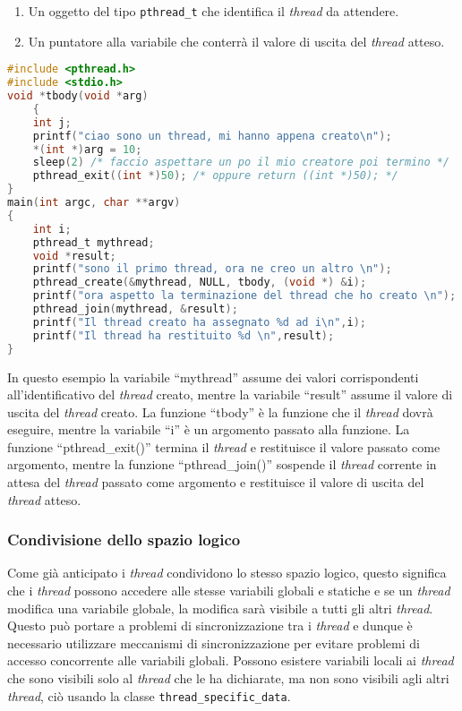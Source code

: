         \begin{enumerate}
            \item Un oggetto del tipo \texttt{pthread\_t} che identifica il \textit{thread} da attendere.
            \item Un puntatore alla variabile che conterrà il valore di uscita del \textit{thread} atteso.
        \end{enumerate}
\begin{lstlisting}[language=C]
#include <pthread.h>
#include <stdio.h>
void *tbody(void *arg)
    {
    int j;
    printf("ciao sono un thread, mi hanno appena creato\n");
    *(int *)arg = 10;
    sleep(2) /* faccio aspettare un po il mio creatore poi termino */
    pthread_exit((int *)50); /* oppure return ((int *)50); */
}
main(int argc, char **argv)
{
    int i;
    pthread_t mythread;
    void *result;
    printf("sono il primo thread, ora ne creo un altro \n");
    pthread_create(&mythread, NULL, tbody, (void *) &i);
    printf("ora aspetto la terminazione del thread che ho creato \n");
    pthread_join(mythread, &result);
    printf("Il thread creato ha assegnato %d ad i\n",i);
    printf("Il thread ha restituito %d \n",result);
}
\end{lstlisting}
    In questo esempio la variabile ``mythread'' assume dei valori corrispondenti all'identificativo del \textit{thread} creato, mentre la variabile ``result'' assume il valore di uscita del \textit{thread} creato. La funzione ``tbody'' è la funzione che il \textit{thread} dovrà eseguire, mentre la variabile ``i'' è un argomento passato alla funzione. La funzione ``pthread\_exit()'' termina il \textit{thread} e restituisce il valore passato come argomento, mentre la funzione ``pthread\_join()'' sospende il \textit{thread} corrente in attesa del \textit{thread} passato come argomento e restituisce il valore di uscita del \textit{thread} atteso.
    \subsubsection{Condivisione dello spazio logico} 
        Come già anticipato i \textit{thread} condividono lo stesso spazio logico, questo significa che i \textit{thread} possono accedere alle stesse variabili globali e statiche e se un \textit{thread} modifica una variabile globale, la modifica sarà visibile a tutti gli altri \textit{thread}. Questo può portare a problemi di sincronizzazione tra i \textit{thread} e dunque è necessario utilizzare meccanismi di sincronizzazione per evitare problemi di accesso concorrente alle variabili globali. Possono esistere variabili locali ai \textit{thread} che sono visibili solo al \textit{thread} che le ha dichiarate, ma non sono visibili agli altri \textit{thread}, ciò usando la classe \texttt{thread\_specific\_data}.
